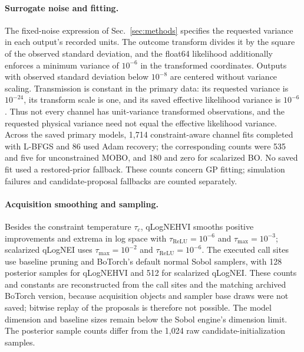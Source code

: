 \documentclass[aps,prab,reprint,superscriptaddress,amsmath,amssymb,floatfix]{revtex4-2}
\begin{document}
\paragraph{Surrogate noise and fitting.} The fixed-noise expression of
Sec.~\ref{sec:methods} specifies the requested variance in each output's recorded units. The
outcome transform divides it by the square of the observed standard deviation, and the float64
likelihood additionally enforces a minimum variance of $10^{-6}$ in the transformed
coordinates. Outputs with observed standard deviation below $10^{-8}$ are centered without
variance scaling. Transmission is constant in the primary data: its requested variance is
$10^{-24}$, its transform scale is one, and its saved effective likelihood variance is
$10^{-6}$. Thus not every channel has unit-variance transformed observations, and the
requested physical variance need not equal the effective likelihood variance. Across the saved
primary models, 1,714 constraint-aware channel fits completed with L-BFGS and 86 used Adam
recovery; the corresponding counts were 535 and five for unconstrained MOBO, and 180 and zero
for scalarized BO. No saved fit used a restored-prior fallback. These counts concern GP fitting;
simulation failures and candidate-proposal fallbacks are
counted separately.

\paragraph{Acquisition smoothing and sampling.} Besides the constraint temperature $\tau_c$,
qLogNEHVI smooths positive improvements and extrema in log space with
$\tau_{\mathrm{ReLU}}=10^{-6}$ and $\tau_{\max}=10^{-3}$; scalarized qLogNEI uses
$\tau_{\max}=10^{-2}$ and $\tau_{\mathrm{ReLU}}=10^{-6}$. The executed call sites use baseline
pruning and BoTorch's default normal Sobol samplers, with 128 posterior samples for qLogNEHVI
and 512 for scalarized qLogNEI. These counts and constants are reconstructed from the call
sites and the matching archived BoTorch version, because acquisition objects and sampler base
draws were not saved; bitwise replay of the proposals is therefore not possible. The model
dimension and baseline sizes remain below the Sobol engine's dimension limit. The posterior
sample counts differ from the 1,024 raw candidate-initialization samples.
\end{document}

